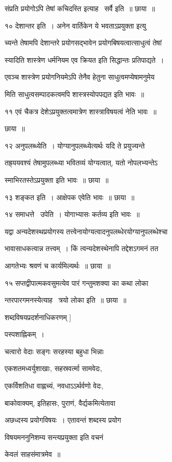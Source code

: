 \documentclass[11pt, openany]{book}
\begin{document}
संप्रति {\qt प्रयोगोऽपि तेषां कचिदस्ति} इत्याह \textendash\ सर्वै इति~॥ छाया~॥ 

१० देशान्तर इति~। अनेन वार्तिकेन ये भवताऽप्रयुक्ता इत्यु \textendash\ 

च्यन्ते तेषामपि देशान्तरे प्रयोगसद्भावेन प्रयोगबिषयत्वात्साधुत्वं तेषां


स्यादिति शास्त्रेण धर्मनियम एव क्रियत इति सिद्धान्तः प्रतिपाद्यते~। 

एवञ्च शास्त्रेण प्रयोगनियमेऽपि तेनैव हेतुना साधुत्वमप्येषामनुमेय \textendash\ 

मिति साधुत्वसम्पादकत्वमपि शास्त्रस्योपपद्यत इति भावः~॥ 

११ एवं चैकत्र देशेऽप्रयुक्तत्वमात्रेण शास्त्राविषयत्वं नेति भावः~॥ 

छाया~॥ 

१२ अनुपलब्ध्येति~। योग्यानुपलब्ध्येत्यर्थः यदि ते प्रयुज्यन्ते 

तह्र्ययवश्यं तेषामुपलब्ध्या भवितव्यं योग्यत्वात्, यतो नोपलभ्यन्तेऽ \textendash\ 

स्माभिरतस्तेऽप्रयुक्ता इति भावः~॥ छाया~॥ 

१३ शङ्कत इति~। आक्षेपक एवेति भावः~॥ छाया~॥ 

१४ समाधत्ते \textendash\ उपेति~। योगाभ्यासः कर्तव्य इति भावः~॥ 

यद्वा अन्यदेशस्थप्रयोगस्य
तत्त्वेनायोग्यत्वादनुपलब्धेरयोग्यानुपलब्धेश्चा \textendash\ 

भावासाधकत्वान्न तत्त्वम्~। किं त्वन्यदेशस्थेनापि तद्देशऽगमनं तत 

आगतेभ्यः श्रवणं च कार्यमिल्यर्थः~॥ छाया~॥ 

१५ सप्तद्वीपात्मकवसुमत्येव पारं गन्तुमशक्या का कथा लोका \textendash\ 

न्तरपारगमनस्येत्याह \textendash\ त्रयो लोका इति~॥ छाया~॥ 

शब्दविषयप्रदर्शनाधिकरणम् ] 

पस्पशाह्निकम्~। 



चत्वारो वेदाः सङ्गः सरहस्या बहुधा भिन्नाः

एकशतमध्वर्युशाखाः, सहस्रवर्त्मा सामवेदः, 

एकर्विशतिधा वाह्णच्यं, नवधाऽऽर्थर्वणो वेदः, 

बाकोवाक्यम्, इतिहासः, पुराणं, वैर्द्यकमित्येतावा \textendash\ 

अछध्दस्य प्रयोगविषयः~। एतावन्तं शब्दस्य प्रयोग \textendash\ 

विषयमननुनिशम्य {\qt सन्त्यप्रयुक्ता }इति वचनं 

केवलं साहसंमात्रमेव~॥ 
\end{document}
